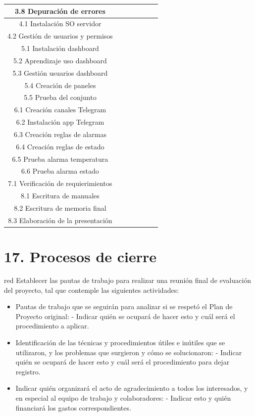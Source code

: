 \documentclass[11pt]{charter}
\begin{document}
\begin{table}[!htpb]
{\begin{tabular}{|c|c|c|c|c|c|c|}
 3.8 Depuración de errores  &  &   &  &&\\ \hline
 4.1 Instalación SO servidor  &  &  &  &&\\ \hline
 4.2 Gestión de usuarios y permisos &  &&  &  &\\ \hline
 5.1 Instalación dashboard  &  &  &  &&\\ \hline 
 5.2 Aprendizaje uso dashboard  &  &  &&  &\\ \hline
 5.3 Gestión usuarios dashboard  &  &&  &  &\\ \hline
 5.4 Creación de paneles  &  &  &  &&\\ \hline
 5.5 Prueba del conjunto  &  &  &  &&\\ \hline 
 6.1 Creación canales Telegram  &  &  &  &&\\ \hline
 6.2 Instalación app Telegram &  &  &  & & \\ \hline
 6.3 Creación reglas de alarmas &  &  & & &\\ \hline
 6.4 Creación reglas de estado &   &  &&  &\\ \hline
 6.5 Prueba alarma temperatura &   &  &&  &\\ \hline
 6.6 Prueba alarma estado &  &  &  & &\\ \hline
 7.1 Verificación de requierimientos &&  &  &  &\\ \hline
 8.1 Escritura de manuales &  &  &  &&\\ \hline
 8.2 Escritura de memoria final &  &  &  &&\\ \hline
 8.3 Elaboración de la presentación &  &  &  & &\\ \hline

\end{tabular}%
}
\end{table}

\section{17. Procesos de cierre}    
\label{sec:cierre}

\begin{consigna}{red}
Establecer las pautas de trabajo para realizar una reunión final de evaluación del proyecto, tal que contemple las siguientes actividades:

\begin{itemize}
\item Pautas de trabajo que se seguirán para analizar si se respetó el Plan de Proyecto original:
 - Indicar quién se ocupará de hacer esto y cuál será el procedimiento a aplicar. 
\item Identificación de las técnicas y procedimientos útiles e inútiles que se utilizaron, y los problemas que surgieron y cómo se solucionaron:
 - Indicar quién se ocupará de hacer esto y cuál será el procedimiento para dejar registro.
\item Indicar quién organizará el acto de agradecimiento a todos los interesados, y en especial al equipo de trabajo y colaboradores:
  - Indicar esto y quién financiará los gastos correspondientes.
\end{itemize}

\end{consigna}
\end{document}
